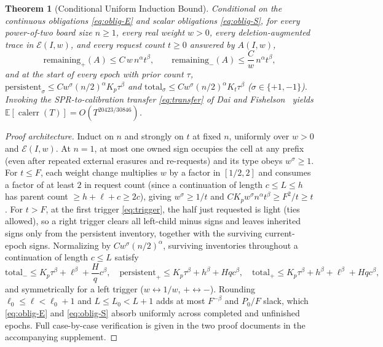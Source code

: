 \documentclass[11pt,letterpaper]{article}
\newtheorem{theorem}{Theorem}[section]
\theoremstyle{definition}
\theoremstyle{remark}
\newcommand{\E}{\mathbb{E}}
\newcommand{\calerr}{\operatorname{calerr}}
\newcommand{\cE}{\mathcal{E}}
\begin{document}
\begin{theorem}[Conditional Uniform Induction Bound]\label{thm:main-cal}
Conditional on the continuous obligations \eqref{eq:oblig-E} and scalar obligations \eqref{eq:oblig-S}, for every power-of-two board size $n \ge 1$, every real weight $w>0$, every deletion-augmented trace in $\cE(I,w)$, and every request count $t \ge 0$ answered by $A(I,w)$,
\begin{equation}\label{eq:ind-bound}
  \mathrm{remaining}_+(A) \le C\, w\, n^\alpha t^\beta, \qquad
  \mathrm{remaining}_-(A) \le \frac{C}{w}\, n^\alpha t^\beta,
\end{equation}
and at the start of every epoch with prior count $\tau$, $\mathrm{persistent}_\sigma \le C w^\sigma (n/2)^\alpha K_p \tau^\beta$ and $\mathrm{total}_\sigma \le C w^\sigma (n/2)^\alpha K_t \tau^\beta$ ($\sigma \in \{+1,-1\}$). Invoking the SPR-to-calibration transfer \eqref{eq:transfer} of Dai and Fishelson~\cite{DaiFishelson2026} yields $\E[\calerr(T)] = O(T^{20423/30846})$.
\end{theorem}
\begin{proof}[Proof architecture]
Induct on $n$ and strongly on $t$ at fixed $n$, uniformly over $w>0$ and $\cE(I,w)$. At $n=1$, at most one owned sign occupies the cell at any prefix (even after repeated external erasures and re-requests) and its type obeys $w^\sigma \ge 1$. For $t \le F$, each weight change multiplies $w$ by a factor in $[1/2,2]$ and consumes a factor of at least $2$ in request count (since a continuation of length $c \le L \le h$ has parent count $\ge h+\ell+c \ge 2c$), giving $w^\sigma \ge 1/t$ and $C K_p w^\sigma n^\alpha t^\beta \ge F^2/t \ge t$. For $t > F$, at the first trigger \eqref{eq:trigger}, the half just requested is light (ties allowed), so a right trigger clears all left-child minus signs and leaves inherited signs only from the persistent inventory, together with the surviving current-epoch signs. Normalizing by $C w^\sigma (n/2)^\alpha$, surviving inventories throughout a continuation of length $c \le L$ satisfy
\[
  \mathrm{total}_- \le K_p\tau^\beta + \ell^\beta + \frac{H}{q}c^\beta, \quad
  \mathrm{persistent}_+ \le K_p\tau^\beta + h^\beta + Hq c^\beta, \quad
  \mathrm{total}_+ \le K_p\tau^\beta + h^\beta + \ell^\beta + Hq c^\beta,
\]
and symmetrically for a left trigger ($w \leftrightarrow 1/w$, $+\leftrightarrow -$). Rounding $\ell_0 \le \ell < \ell_0+1$ and $L \le L_0 < L+1$ adds at most $F^{-\beta}$ and $P_0/F$ slack, which \eqref{eq:oblig-E} and \eqref{eq:oblig-S} absorb uniformly across completed and unfinished epochs. Full case-by-case verification is given in the two proof documents in the accompanying supplement.
\end{proof}
\end{document}
